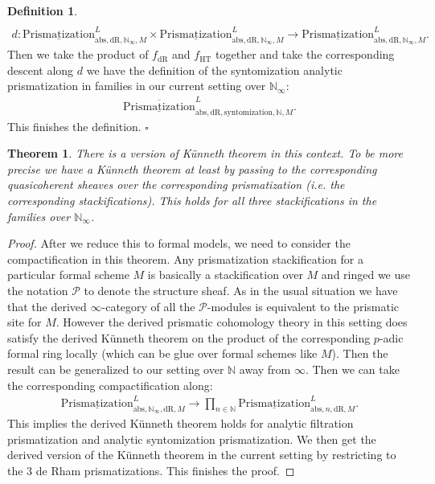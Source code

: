 \documentclass[12pt]{article}
\newtheorem{theorem}{Theorem}
\theoremstyle{definition}
\newtheorem{definition}{Definition}
\begin{document}
\begin{definition}
\begin{align}
\end{align}
\begin{align}
d:  {\underline{\mathrm{Prismatization}}}^L_{\mathrm{abs},\mathrm{dR},\mathbb{N}_\infty,M}\times {\underline{\mathrm{Prismatization}}}^L_{\mathrm{abs},\mathrm{dR},\mathbb{N}_\infty,M} \rightarrow {\underline{\mathrm{Prismatization}}}^L_{\mathrm{abs},\mathrm{dR},\mathbb{N}_\infty,M}.
\end{align}
Then we take the product of $f_\mathrm{dR}$ and $f_\mathrm{HT}$ together and take the corresponding descent along $d$ we have the definition of the syntomization analytic prismatization in families in our current setting over $\mathbb{N}_\infty$:
\begin{align}
\overline{\underline{\mathrm{Prismatization}}}^L_{\mathrm{abs},\mathrm{dR},\mathrm{syntomization},\mathbb{N},M}. 
\end{align}
This finishes the definition. $\square$
\end{definition}

\begin{theorem}\label{theorem20}
There is a version of K\"unneth theorem in this context. To be more precise we have a K\"unneth theorem at least by passing to the corresponding quasicoherent sheaves over the corresponding prismatization (i.e. the corresponding stackifications). This holds for all three stackifications in the families over $\mathbb{N}_\infty$. 
\end{theorem}

\begin{proof}
After we reduce this to formal models, we need to consider the compactification in this theorem. Any prismatization stackification for a particular formal scheme $M$ is basically a stackification over $M$ and ringed we use the notation $\mathcal{P}$ to denote the structure sheaf. As in the usual situation we have that the derived $\infty$-category of all the $\mathcal{P}$-modules is equivalent to the prismatic site for $M$. However the derived prismatic cohomology theory in this setting does satisfy the derived K\"unneth theorem on the product of the corresponding $p$-adic formal ring locally (which can be glue over formal schemes like $M$). Then the result can be generalized to our setting over $\mathbb{N}$ away from $\infty$. Then we can take the corresponding compactification along:
\begin{align}
{\underline{\mathrm{Prismatization}}}^L_{\mathrm{abs},\mathbb{N}_\infty,\mathrm{dR},M}\rightarrow  \prod_{n\in \mathbb{N}} {\underline{\mathrm{Prismatization}}}^L_{\mathrm{abs},n,\mathrm{dR},M}.
\end{align}
This implies the derived K\"unneth theorem holds for analytic filtration prismatization and analytic syntomization prismatization. We then get the derived version of the K\"unneth theorem in the current setting by restricting to the 3 de Rham prismatizations. This finishes the proof.
\end{proof}
\end{document}
